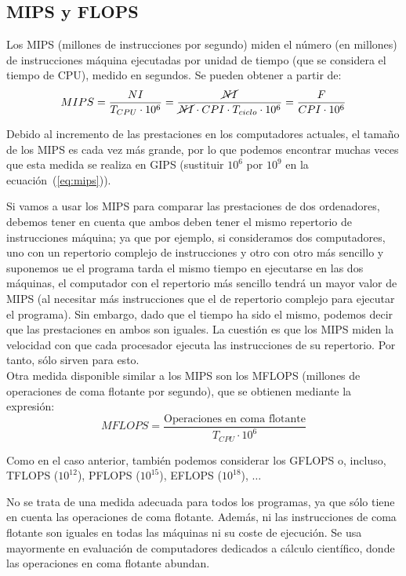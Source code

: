 \subsection{MIPS y FLOPS}
Los MIPS (millones de instrucciones por segundo) miden el número (en millones) de instrucciones máquina ejecutadas por unidad de tiempo (que se considera el tiempo de CPU), medido en segundos. Se pueden obtener a partir de:
\begin{equation} \label{eq:mips}
    MIPS = \dfrac{NI}{T_{CPU} \cdot 10^6} = \dfrac{\cancel{NI}}{\cancel{NI}\cdot CPI \cdot T_{ciclo} \cdot 10^6} = \dfrac{F}{CPI \cdot 10^6}
\end{equation}

Debido al incremento de las prestaciones en los computadores actuales, el tamaño de los MIPS es cada vez más grande, por lo que podemos encontrar muchas veces que esta medida se realiza en GIPS (sustituir $10^6$ por $10^9$ en la ecuación~(\ref{eq:mips})).

Si vamos a usar los MIPS para comparar las prestaciones de dos ordenadores, debemos tener en cuenta que ambos deben tener el mismo repertorio de instrucciones máquina; ya que por ejemplo, si consideramos dos computadores, uno con un repertorio complejo de instrucciones y otro con otro más sencillo y suponemos ue el programa tarda el mismo tiempo en ejecutarse en las dos máquinas, el computador con el repertorio más sencillo tendrá un mayor valor de MIPS (al necesitar más instrucciones que el de repertorio complejo para ejecutar el programa). Sin embargo, dado que el tiempo ha sido el mismo, podemos decir que las prestaciones en ambos son iguales. La cuestión es que los MIPS miden la velocidad con que cada procesador ejecuta las instrucciones de su repertorio. Por tanto, sólo sirven para esto.\\

Otra medida disponible similar a los MIPS son los MFLOPS (millones de operaciones de coma flotante por segundo), que se obtienen mediante la expresión:
\begin{equation}
    MFLOPS = \dfrac{\text{Operaciones en coma flotante}}{T_{CPU} \cdot 10^6}
\end{equation}

Como en el caso anterior, también podemos considerar los GFLOPS o, incluso, TFLOPS ($10^12$), PFLOPS ($10^15$), EFLOPS ($10^18$), $\ldots$ 

No se trata de una medida adecuada para todos los programas, ya que sólo tiene en cuenta las operaciones de coma flotante. Además, ni las instrucciones de coma flotante son iguales en todas las máquinas ni su coste de ejecución. Se usa mayormente en evaluación de computadores dedicados a cálculo científico, donde las operaciones en coma flotante abundan.

